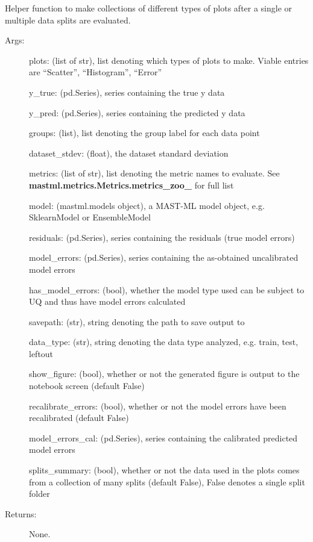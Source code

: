 \documentclass[letterpaper,10pt,english]{sphinxmanual}
\begin{document}
\begin{fulllineitems}
\label{\detokenize{api/mastml.plots.make_plots:mastml.plots.make_plots}}
Helper function to make collections of different types of plots after a single or multiple data splits are evaluated.
\begin{description}
\item[{Args:}] \leavevmode
plots: (list of str), list denoting which types of plots to make. Viable entries are “Scatter”, “Histogram”, “Error”

y\_true: (pd.Series), series containing the true y data

y\_pred: (pd.Series), series containing the predicted y data

groups: (list), list denoting the group label for each data point

dataset\_stdev: (float), the dataset standard deviation

metrics: (list of str), list denoting the metric names to evaluate. See {\color{red}\bfseries{}mastml.metrics.Metrics.metrics\_zoo\_} for full list

model: (mastml.models object), a MAST-ML model object, e.g. SklearnModel or EnsembleModel

residuals: (pd.Series), series containing the residuals (true model errors)

model\_errors: (pd.Series), series containing the as-obtained uncalibrated model errors

has\_model\_errors: (bool), whether the model type used can be subject to UQ and thus have model errors calculated

savepath: (str), string denoting the path to save output to

data\_type: (str), string denoting the data type analyzed, e.g. train, test, leftout

show\_figure: (bool), whether or not the generated figure is output to the notebook screen (default False)

recalibrate\_errors: (bool), whether or not the model errors have been recalibrated (default False)

model\_errors\_cal: (pd.Series), series containing the calibrated predicted model errors

splits\_summary: (bool), whether or not the data used in the plots comes from a collection of many splits (default False), False denotes a single split folder

\item[{Returns:}] \leavevmode
None.

\end{description}

\end{fulllineitems}
\end{document}
